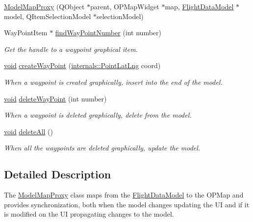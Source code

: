 \begin{DoxyCompactItemize}
\item 
\hyperlink{group___o_p_map_plugin_gaa86a0afe448c45b8ecffde73dff2be16}{\-Model\-Map\-Proxy} (\-Q\-Object $\ast$parent, \-O\-P\-Map\-Widget $\ast$map, \hyperlink{class_flight_data_model}{\-Flight\-Data\-Model} $\ast$model, \-Q\-Item\-Selection\-Model $\ast$selection\-Model)
\item 
\-Way\-Point\-Item $\ast$ \hyperlink{group___o_p_map_plugin_gabc5719db39d81801af2bce5a5dd3eee9}{find\-Way\-Point\-Number} (int number)
\begin{DoxyCompactList}\small\item\em \-Get the handle to a waypoint graphical item. \end{DoxyCompactList}\item 
\hyperlink{group___u_a_v_objects_plugin_ga444cf2ff3f0ecbe028adce838d373f5c}{void} \hyperlink{group___o_p_map_plugin_ga4e68125d7b19aa3adf055e50bea8afdf}{create\-Way\-Point} (\hyperlink{structinternals_1_1_point_lat_lng}{internals\-::\-Point\-Lat\-Lng} coord)
\begin{DoxyCompactList}\small\item\em \-When a waypoint is created graphically, insert into the end of the model. \end{DoxyCompactList}\item 
\hyperlink{group___u_a_v_objects_plugin_ga444cf2ff3f0ecbe028adce838d373f5c}{void} \hyperlink{group___o_p_map_plugin_ga6e67b9c6c661db0b0c02119c6372c5b7}{delete\-Way\-Point} (int number)
\begin{DoxyCompactList}\small\item\em \-When a waypoint is deleted graphically, delete from the model. \end{DoxyCompactList}\item 
\hyperlink{group___u_a_v_objects_plugin_ga444cf2ff3f0ecbe028adce838d373f5c}{void} \hyperlink{group___o_p_map_plugin_gaf33e33d2457fd1ebc593907ffd3c0167}{delete\-All} ()
\begin{DoxyCompactList}\small\item\em \-When all the waypoints are deleted graphically, update the model. \end{DoxyCompactList}\end{DoxyCompactItemize}


\subsection{\-Detailed \-Description}
\-The \hyperlink{class_model_map_proxy}{\-Model\-Map\-Proxy} class maps from the \hyperlink{class_flight_data_model}{\-Flight\-Data\-Model} to the \-O\-P\-Map and provides synchronization, both when the model changes updating the \-U\-I and if it is modified on the \-U\-I propagating changes to the model. 

